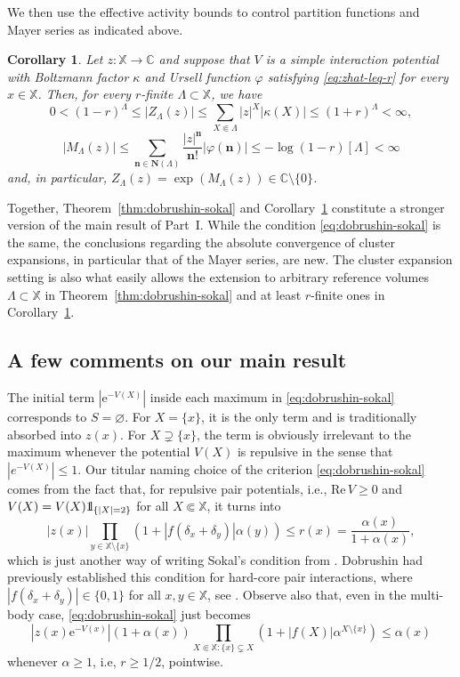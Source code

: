 \documentclass[reqno, 11pt]{amsart}
\newtheorem{cor}[theorem]{Corollary}
\theoremstyle{definition}
\newcommand{\e}{\mathrm{e}}
\newcommand{\C}{\mathbb{C}}
\newcommand{\X}{\mathbb X}
\renewcommand{\Re}{\mathrm{Re}\,}
\def\1{{\mathchoice {1\mskip-4mu\mathrm l}      
{1\mskip-4mu\mathrm l}
{1\mskip-4.5mu\mathrm l} {1\mskip-5mu\mathrm l}}}
\begin{document}
We then use the effective activity bounds to control partition functions and Mayer series as indicated above. 

\begin{cor}	\label{cor:Z-M-r-bounds}
	Let $z : \X \to \C$ and suppose that $V$ is a simple interaction potential with Boltzmann factor $\kappa$ and Ursell function $\varphi$ satisfying \eqref{eq:zhat-leq-r} for every $x \in \X$. Then, for every $r$-finite $\Lambda \subset \X$, we have
	\[
		0 < (1 - r)^\Lambda \leq |Z_\Lambda(z)| \leq \sum_{X \Subset \Lambda} |z|^X |\kappa(X)| \leq (1 + r)^\Lambda < \infty,
	\]
	\[
		|M_\Lambda(z)| \leq \sum_{\mathbf n \in \mathbf N(\Lambda)} \frac{|z|^\mathbf n}{\mathbf n!} |\varphi(\mathbf n)| \leq - \log(1 - r)[\Lambda] < \infty
	\]
	and, in particular, $Z_\Lambda(z) = \exp(M_\Lambda(z)) \in \C \setminus \{0\}$.
\end{cor}

Together, Theorem~\ref{thm:dobrushin-sokal} and Corollary~\ref{cor:Z-M-r-bounds} constitute a stronger version of the main result of Part~I. 
While the condition \eqref{eq:dobrushin-sokal} is the same, the conclusions regarding the absolute convergence of cluster expansions, in particular that of the Mayer series, are new. 
The cluster expansion setting is also what easily allows the extension to arbitrary reference volumes $\Lambda \subset \X$ in Theorem~\ref{thm:dobrushin-sokal} and at least $r$-finite ones in Corollary~\ref{cor:Z-M-r-bounds}.

\subsection{A few comments on our main result}

The initial term $|\e^{-V(X)}|$ inside each maximum in \eqref{eq:dobrushin-sokal} corresponds to $S = \varnothing$. 
For $X = \{x\}$, it is the only term and is traditionally absorbed into $z(x)$. 
For $X \supsetneq \{x\}$, the term is obviously irrelevant to the maximum whenever the potential $V(X)$ is repulsive in the sense that $|e^{-V(X)}| \leq 1$. 
Our titular naming choice of the criterion \eqref{eq:dobrushin-sokal} comes from the fact that, for repulsive pair potentials, i.e., $\Re V \geq 0$ and $V(X) = V(X) \1_{\{|X| = 2\}}$ for all $X \Subset \X$, it turns into
\[
	|z(x)| \prod_{y \in \X \setminus \{x\}} (1 + |f(\delta_x + \delta_y)| \alpha(y)) \leq r(x) = \frac{\alpha(x)}{1 + \alpha(x)},
\]
which is just another way of writing Sokal's condition from \cite{ref:sokal, ref:scott-sokal}. 
Dobrushin had previously established this condition for hard-core pair interactions, where $|f(\delta_x+\delta_y)| \in \{0,1\}$ for all $x, y \in \X$, see \cite{ref:dobrushin-semi-invariants, ref:dobrushin-saint-flour}.
Observe also that, even in the multi-body case, \eqref{eq:dobrushin-sokal} just becomes
\[
	|z(x) \e^{-V(x)}| (1 + \alpha(x)) \prod_{X \Subset \X : \{x\} \subsetneq X} (1 + |f(X)| \alpha^{X \setminus \{x\}}) \leq \alpha(x)
\]
whenever $\alpha \geq 1$, i.e, $r \geq 1/2$, pointwise.
\end{document}
